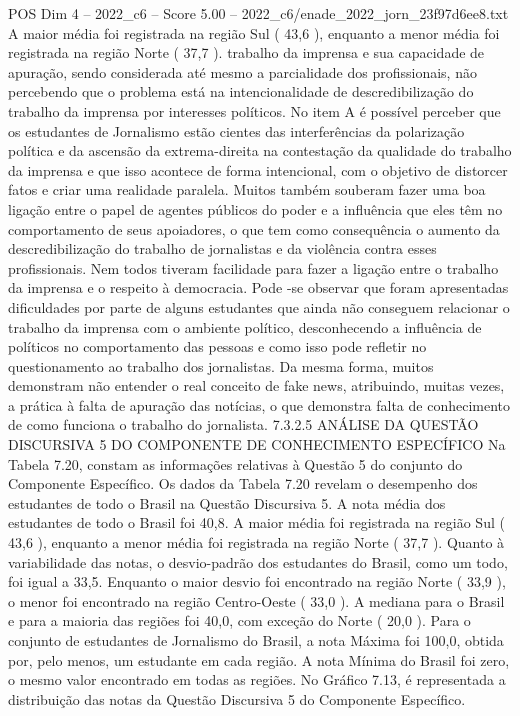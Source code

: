\begin{textsample}{POS Dim 4 – 2022\_c6 – Score 5.00 – 2022\_c6/enade\_2022\_jorn\_23f97d6ee8.txt}
A maior média foi registrada na região Sul ( 43,6 ), enquanto a menor média foi registrada na região Norte ( 37,7 ). trabalho da imprensa e sua capacidade de apuração, sendo considerada até mesmo a parcialidade dos profissionais, não percebendo que o problema está na intencionalidade de descredibilização do trabalho da imprensa por interesses políticos.
No item A é possível perceber que os estudantes de Jornalismo estão cientes das interferências da polarização política e da ascensão da extrema-direita na contestação da qualidade do trabalho da imprensa e que isso acontece de forma intencional, com o objetivo de distorcer fatos e criar uma realidade paralela.
Muitos também souberam fazer uma boa ligação entre o papel de agentes públicos do poder e a influência que eles têm no comportamento de seus apoiadores, o que tem como consequência o aumento da descredibilização do trabalho de jornalistas e da violência contra esses profissionais.
Nem todos tiveram facilidade para fazer a ligação entre o trabalho da imprensa e o respeito à democracia.
Pode -se observar que foram apresentadas dificuldades por parte de alguns estudantes que ainda não conseguem relacionar o trabalho da imprensa com o ambiente político, desconhecendo a influência de políticos no comportamento das pessoas e como isso pode refletir no questionamento ao trabalho dos jornalistas.
Da mesma forma, muitos demonstram não entender o real conceito de fake news, atribuindo, muitas vezes, a prática à falta de apuração das notícias, o que demonstra falta de conhecimento de como funciona o trabalho do jornalista. 7.3.2.5 ANÁLISE DA QUESTÃO DISCURSIVA 5 DO COMPONENTE DE CONHECIMENTO ESPECÍFICO Na Tabela 7.20, constam as informações relativas à Questão 5 do conjunto do Componente Específico.
Os dados da Tabela 7.20 revelam o desempenho dos estudantes de todo o Brasil na Questão Discursiva 5.
A nota média dos estudantes de todo o Brasil foi 40,8.
A maior média foi registrada na região Sul ( 43,6 ), enquanto a menor média foi registrada na região Norte ( 37,7 ).
Quanto à variabilidade das notas, o desvio-padrão dos estudantes do Brasil, como um todo, foi igual a 33,5.
Enquanto o maior desvio foi encontrado na região Norte ( 33,9 ), o menor foi encontrado na região Centro-Oeste ( 33,0 ).
A mediana para o Brasil e para a maioria das regiões foi 40,0, com exceção do Norte ( 20,0 ).
Para o conjunto de estudantes de Jornalismo do Brasil, a nota Máxima foi 100,0, obtida por, pelo menos, um estudante em cada região.
A nota Mínima do Brasil foi zero, o mesmo valor encontrado em todas as regiões.
No Gráfico 7.13, é representada a distribuição das notas da Questão Discursiva 5 do Componente Específico.

\end{textsample}
